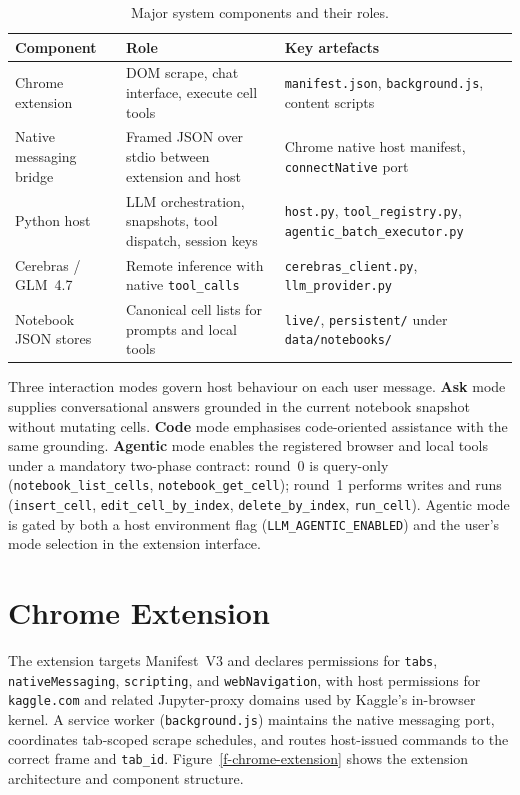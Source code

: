 \begin{table}[!ht]
\centering
\caption{Major system components and their roles.}
\label{tab:components}
\small
\begin{tabular}{|p{2.8cm}|p{4.2cm}|p{5.2cm}|}
\hline
\textbf{Component} & \textbf{Role} & \textbf{Key artefacts} \\ \hline
Chrome extension & \ac{DOM} scrape, chat interface, execute cell tools & \texttt{manifest.json}, \texttt{background.js}, content scripts \\ \hline
Native messaging bridge & Framed JSON over stdio between extension and host & Chrome native host manifest, \texttt{connectNative} port \\ \hline
Python host & \ac{LLM} orchestration, snapshots, tool dispatch, session keys & \texttt{host.py}, \texttt{tool\_registry.py}, \texttt{agentic\_batch\_executor.py} \\ \hline
Cerebras / GLM~4.7 & Remote inference with native \texttt{tool\_calls} & \texttt{cerebras\_client.py}, \texttt{llm\_provider.py} \\ \hline
Notebook JSON stores & Canonical cell lists for prompts and local tools & \texttt{live/}, \texttt{persistent/} under \texttt{data/notebooks/} \\ \hline
\end{tabular}
\end{table}

Three interaction modes govern host behaviour on each user message. \textbf{Ask} mode supplies conversational answers grounded in the current notebook snapshot without mutating cells. \textbf{Code} mode emphasises code-oriented assistance with the same grounding. \textbf{Agentic} mode enables the registered browser and local tools under a mandatory two-phase contract: round~0 is query-only (\texttt{notebook\_list\_cells}, \texttt{notebook\_get\_cell}); round~1 performs writes and runs (\texttt{insert\_cell}, \texttt{edit\_cell\_by\_index}, \texttt{delete\_by\_index}, \texttt{run\_cell}). Agentic mode is gated by both a host environment flag (\texttt{LLM\_AGENTIC\_ENABLED}) and the user's mode selection in the extension interface.

\section{Chrome Extension}
\label{sec:chrome-extension}

The extension targets Manifest~V3 and declares permissions for \texttt{tabs}, \texttt{nativeMessaging}, \texttt{scripting}, and \texttt{webNavigation}, with host permissions for \texttt{kaggle.com} and related Jupyter-proxy domains used by Kaggle's in-browser kernel. A service worker (\texttt{background.js}) maintains the native messaging port, coordinates tab-scoped scrape schedules, and routes host-issued commands to the correct frame and \texttt{tab\_id}. Figure~\ref{f-chrome-extension} shows the extension architecture and component structure.

